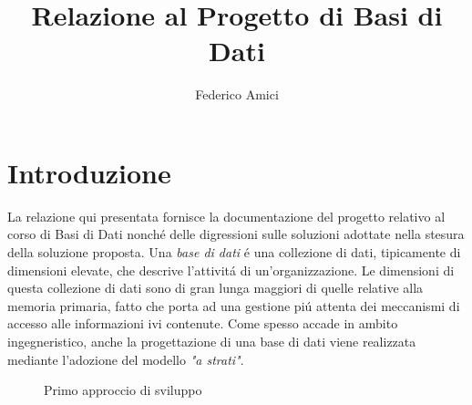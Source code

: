 \documentclass[12pt,a4paper,onecolumn,x11names]{article}
\title{Relazione al Progetto di Basi di Dati}
\author{Federico Amici}
\begin{document}
\maketitle
\newpage
\tableofcontents
\listoftables
\listoffigures
\newpage


\section{Introduzione}
	\begin{flushleft}
		La relazione qui presentata fornisce la documentazione del progetto relativo al corso di Basi di Dati nonch\'{e} delle digressioni sulle soluzioni adottate nella stesura della soluzione proposta.
		Una \textit{base di dati} \'{e} una collezione di dati, tipicamente di dimensioni elevate, che descrive l'attivit\'{a} di un'organizzazione. Le dimensioni di questa collezione di dati sono di gran lunga maggiori di quelle relative alla memoria primaria, fatto che porta ad una gestione pi\'{u} attenta dei meccanismi di accesso alle informazioni ivi contenute.\newline
		Come spesso accade in ambito ingegneristico, anche la progettazione di una base di dati viene realizzata mediante l'adozione del modello \textit{"a strati"}. \newline
	\end{flushleft}
	
	\begin{center}
		\begin{figure}[h]
			\centering{}
		\caption{Primo approccio di sviluppo}
		\end{figure}
	\end{center}
\end{document}

